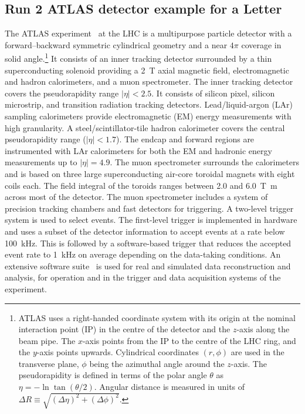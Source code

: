 \newcommand{\AtlasCoordFootnote}{%
ATLAS uses a right-handed coordinate system with its origin at the nominal interaction point (IP)
in the centre of the detector and the \(z\)-axis along the beam pipe.
The \(x\)-axis points from the IP to the centre of the LHC ring,
and the \(y\)-axis points upwards.
Cylindrical coordinates \((r,\phi)\) are used in the transverse plane, 
\(\phi\) being the azimuthal angle around the \(z\)-axis.
The pseudorapidity is defined in terms of the polar angle \(\theta\) as \(\eta = -\ln \tan(\theta/2)\).
Angular distance is measured in units of \(\Delta R \equiv \sqrt{(\Delta\eta)^{2} + (\Delta\phi)^{2}}\).}

\subsection{Run 2 ATLAS detector example for a Letter}
\label{sec:atlas2a}

The ATLAS experiment~\cite{PERF-2007-01} at the LHC is a multipurpose particle detector
with a forward--backward symmetric cylindrical geometry and a near \(4\pi\) coverage in 
solid angle.\footnote{\AtlasCoordFootnote}
It consists of an inner tracking detector surrounded by a thin superconducting solenoid
providing a \SI{2}{\tesla} axial magnetic field, electromagnetic and hadron calorimeters, and a muon spectrometer.
The inner tracking detector covers the pseudorapidity range \(|\eta| < 2.5\).
It consists of silicon pixel, silicon microstrip, and transition radiation tracking detectors.
Lead/liquid-argon (LAr) sampling calorimeters provide electromagnetic (EM) energy measurements
with high granularity.
A steel/scintillator-tile hadron calorimeter covers the central pseudorapidity range (\(|\eta| < 1.7\)).
The endcap and forward regions are instrumented with LAr calorimeters
for both the EM and hadronic energy measurements up to \(|\eta| = 4.9\).
The muon spectrometer surrounds the calorimeters and is based on
three large superconducting air-core toroidal magnets with eight coils each.
The field integral of the toroids ranges between \num{2.0} and \SI{6.0}{\tesla\metre}
across most of the detector. 
The muon spectrometer includes a system of precision tracking chambers and fast detectors for triggering.
A two-level trigger system is used to select events.
The first-level trigger is implemented in hardware and uses a subset of the detector information
to accept events at a rate below \SI{100}{\kHz}.
This is followed by a software-based trigger that
reduces the accepted event rate to \SI{1}{\kHz} on average
depending on the data-taking conditions.
An extensive software suite~\cite{ATL-SOFT-PUB-2021-001} is used for real and simulated data reconstruction
and analysis, for operation and in the trigger and data acquisition systems of the experiment.

